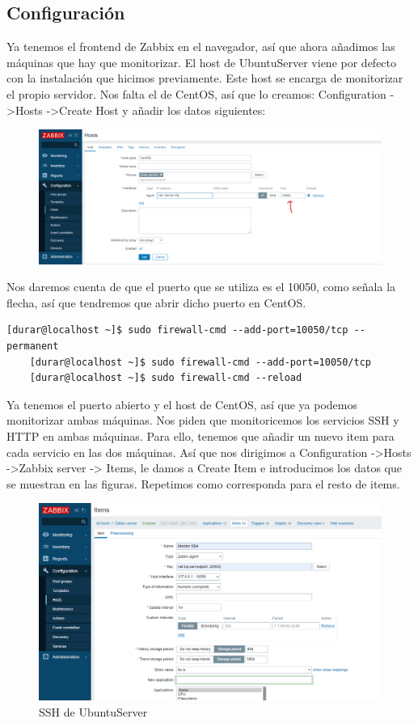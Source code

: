 \documentclass[a4paper]{article}
\begin{document}
\subsection{Configuración}
Ya tenemos el frontend de Zabbix en el navegador, así que ahora añadimos las máquinas que hay que monitorizar.
El host de UbuntuServer viene por defecto con la instalación que hicimos previamente. Este host se encarga 
de monitorizar el propio servidor. Nos falta el de CentOS, así que lo creamos:
Configuration -\textgreater Hosts -\textgreater Create Host y añadir los datos siguientes:
\newpage
\begin{figure}
    \centering
    \includegraphics[width=\textwidth]{creando host centos.png}
\end{figure}
Nos daremos cuenta de que el puerto que se utiliza es el 10050, como señala la flecha, así que tendremos 
que abrir dicho puerto en CentOS.
\begin{lstlisting}[style=bashCentOS]
    [durar@localhost ~]$ sudo firewall-cmd --add-port=10050/tcp --permanent
    [durar@localhost ~]$ sudo firewall-cmd --add-port=10050/tcp
    [durar@localhost ~]$ sudo firewall-cmd --reload
\end{lstlisting}
Ya tenemos el puerto abierto y el host de CentOS, así que ya podemos monitorizar ambas máquinas.
Nos piden que monitoricemos los servicios SSH y HTTP en ambas máquinas. Para ello, tenemos que añadir
un nuevo item para cada servicio en las dos máquinas. 
Así que nos dirigimos a Configuration -\textgreater Hosts -\textgreater Zabbix server -\textgreater
Items, le damos a Create Item e introducimos los datos que se muestran en las figuras. Repetimos como 
corresponda para el resto de items.
\newline
\begin{figure}[hbt!]
    \caption{SSH de UbuntuServer}
    \includegraphics[width=\textwidth]{creando item ssh.png}
\end{figure} 
\end{document}
